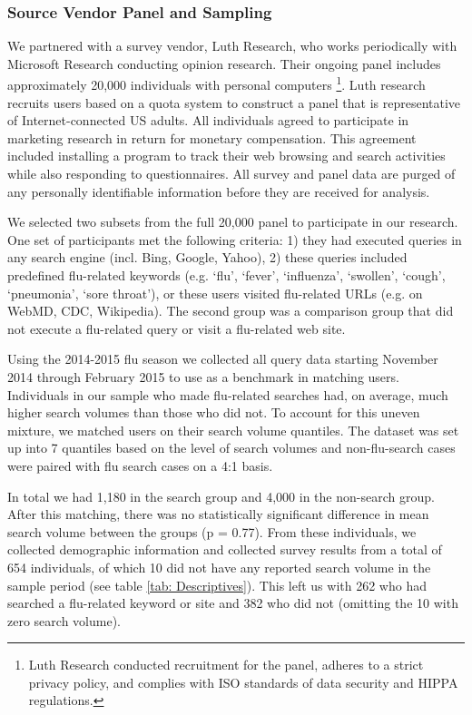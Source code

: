 \documentclass[12pt]{article}
\begin{document}
\subsubsection{Source Vendor Panel and Sampling}
We partnered with a survey vendor, Luth Research, who works periodically with Microsoft Research conducting opinion research. Their ongoing panel includes approximately 20,000 individuals with personal computers  \footnote{Luth Research conducted recruitment for the panel, adheres to a strict privacy policy, and complies with ISO standards of data security and HIPPA regulations.}. Luth research recruits users based on a quota system to construct a panel that is representative of Internet-connected US adults. All individuals agreed to participate in marketing research in return for monetary compensation. This agreement included installing a program to track their web browsing and search activities while also responding to questionnaires. All survey and panel data are purged of any personally identifiable information before they are received for analysis.  

We selected two subsets from the full 20,000 panel to participate in our research. One set of participants met the following criteria: 1) they had executed queries in any search engine (incl. Bing, Google, Yahoo), 2) these queries included predefined flu-related keywords (e.g. `flu', `fever', `influenza', `swollen', `cough', `pneumonia', `sore throat'), or these users visited flu-related URLs (e.g. on WebMD, CDC, Wikipedia). The second group was a comparison group that did not execute a flu-related query or visit a flu-related web site. 

Using the 2014-2015 flu season we collected all query data starting November 2014 through February 2015 to use as a benchmark in matching users. Individuals in our sample who made flu-related searches had, on average, much higher search volumes than those who did not. To account for this uneven mixture, we matched users on their search volume quantiles. The dataset was set up into 7 quantiles based on the level of search volumes and non-flu-search cases were paired with flu search cases on a 4:1 basis. 

In total we had 1,180 in the search group and 4,000 in the non-search group. After this matching, there was no statistically significant difference in mean search volume between the groups (p = 0.77). From these individuals, we collected demographic information and collected survey results from a total of 654 individuals, of which 10 did not have any reported search volume in the sample period (see table \ref{tab: Descriptives}). This left us with 262 who had searched a flu-related keyword or site and 382 who did not (omitting the 10 with zero search volume). 
\end{document}
